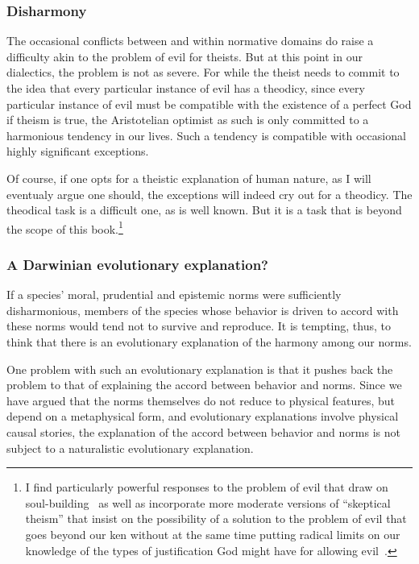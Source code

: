 \subsubsection{Disharmony}
The occasional conflicts between and within normative domains do raise a difficulty akin to the problem of evil for theists.
But at this point in our dialectics, the problem is not as severe. For while the theist needs to commit to the idea that 
every particular instance of evil has a theodicy, since every particular instance of evil must be compatible with the existence
of a perfect God if theism is true, the Aristotelian optimist as such is only committed to a harmonious tendency in our 
lives. Such a tendency is compatible with occasional highly significant exceptions.

Of course, if one opts for a theistic explanation of human nature, as I will eventualy argue one should, the exceptions 
will indeed cry out for a theodicy. The theodical task is a difficult one, as is well known. But it is a task that is 
beyond the scope of this book.\footnote{\label{fn:evil}I find particularly powerful responses to the problem of evil that draw
on soul-building~\parencite{HickSoulmaking,Stump2010} as well as incorporate more moderate versions of ``skeptical theism''
that insist on the possibility of a solution to the problem of evil that goes beyond our ken without at the same
time putting radical limits on our knowledge of the types of justification God might have for allowing evil~\parencite{AlstonEvil,DoughertyPrussAnomaly}.}

\subsubsection{A Darwinian evolutionary explanation?}
If a species' moral, prudential and epistemic norms were sufficiently disharmonious, members of the species whose 
behavior is driven to accord with these norms would tend not to survive and reproduce. It is tempting, thus, to think
that there is an evolutionary explanation of the harmony among our norms. 

One problem with such an evolutionary explanation is that it pushes back the problem to that of explaining the accord
between behavior and norms. Since we have argued that the norms themselves do not reduce to physical features, but 
depend on a metaphysical form, and evolutionary explanations involve physical causal stories, the explanation of the 
accord between behavior and norms is not subject to a naturalistic evolutionary explanation. 

